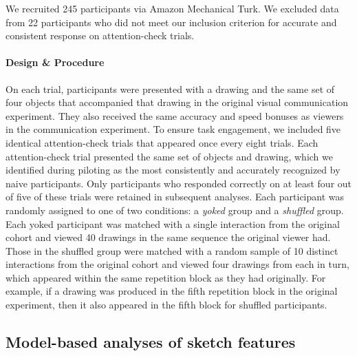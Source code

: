 \documentclass[11pt,letterpaper]{article}
\begin{document}
We recruited 245 participants via Amazon Mechanical Turk.
We excluded data from 22 participants who did not meet our inclusion criterion for accurate and consistent response on attention-check trials.

\paragraph{Design \& Procedure}

On each trial, participants were presented with a drawing and the same set of four objects that accompanied that drawing in the original visual communication experiment.
They also received the same accuracy and speed bonuses as viewers in the communication experiment.
To ensure task engagement, we included five identical attention-check trials that appeared once every eight trials.
Each attention-check trial presented the same set of objects and drawing, which we identified during piloting as the most consistently and accurately recognized by naive participants.
Only participants who responded correctly on at least four out of five of these trials were retained in subsequent analyses.
Each participant was randomly assigned to one of two conditions: a \textit{yoked} group and a \textit{shuffled} group.
Each yoked participant was matched with a single interaction from the original cohort and viewed 40 drawings in the same sequence the original viewer had.
Those in the shuffled group were matched with a random sample of 10 distinct interactions from the original cohort and viewed four drawings from each in turn, which appeared within the same repetition block as they had originally.
For example, if a drawing was produced in the fifth repetition block in the original experiment, then it also appeared in the fifth block for shuffled participants.

\subsection{Model-based analyses of sketch features}
\end{document}
